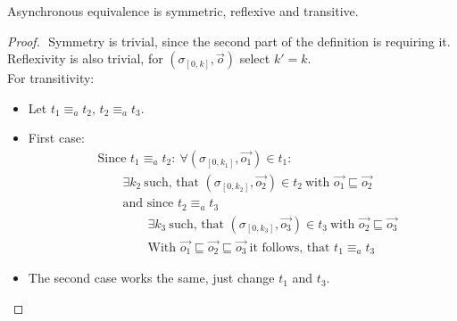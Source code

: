 \begin{lemma}[name=Asynchronous equivalence is an equivalence Relation]\label{lemma:async_equivalence_is_equivalence_relationship}
  Asynchronous equivalence is symmetric, reflexive and transitive.
\end{lemma}
\begin{proof}$ $\newline
    Symmetry is trivial, since the second part of the definition is requiring it.\\
    Reflexivity is also trivial, for \((\sigma_{[0,k]}, \vec{o})\) select \(k' = k\).\\
    For transitivity:
    \begin{itemize}[label = {}]
      \item Let \(t_1 \equiv_a t_2\), \(t_2 \equiv_a t_3\).
      \item First case:
        \begin{align*}
          &\text{Since } t_1 \equiv_a t_2:\ \forall (\sigma_{[0,k_1]}, \vec{o_1}) \in t_1: \\
          &\hspace{2em} \exists k_2\ \text{such, that } (\sigma_{[0,k_2]}, \vec{o_2}) \in t_2\ \text{with } \vec{o_1} \sqsubseteq \vec{o_2} \\
          &\hspace{2em} \text{and since } t_2 \equiv_a t_3 \\
          &\hspace{4em} \exists k_3\ \text{such, that } (\sigma_{[0,k_3]}, \vec{o_3}) \in t_3\ \text{with } \vec{o_2} \sqsubseteq \vec{o_3}\\
          &\hspace{4em} \text{With } \vec{o_1} \sqsubseteq \vec{o_2} \sqsubseteq \vec{o_3}\ \text{it follows, that } t_1 \equiv_a t_3
        \end{align*}
      \item The second case works the same, just change \(t_1\) and \(t_3\).
    \end{itemize}
\end{proof}

